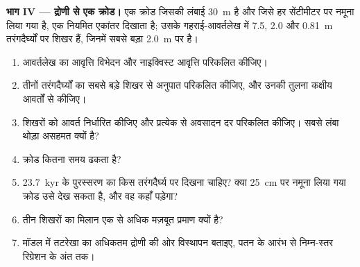 \begin{problem}
\medskip\noindent\textbf{भाग IV --- द्रोणी से एक क्रोड।} एक क्रोड
  जिसकी लंबाई \qty{30}{m} है और जिसे हर सेंटीमीटर पर नमूना लिया गया है, एक नियमित एकांतर दिखाता है;
  उसके गहराई-आवर्तलेख में 7.5, 2.0 और \qty{0.81}{m} तरंगदैर्घ्यों पर शिखर हैं,
  जिनमें सबसे बड़ा \qty{2.0}{m} पर है।
\begin{enumerate}[resume]
\item आवर्तलेख का आवृत्ति विभेदन और
  नाइक्विस्ट आवृत्ति परिकलित कीजिए।
\item तीनों तरंगदैर्घ्यों का सबसे बड़े शिखर से अनुपात परिकलित कीजिए, और
  उनकी तुलना कक्षीय आवर्तों से कीजिए।
\item शिखरों को आवर्त निर्धारित कीजिए और
  प्रत्येक से अवसादन दर परिकलित कीजिए। सबसे लंबा थोड़ा असहमत क्यों है?
\item क्रोड कितना समय ढकता है?
\item \qty{23.7}{kyr} के पुरस्सरण का किस तरंगदैर्घ्य पर दिखना चाहिए?
  क्या \qty{25}{cm} पर नमूना लिया गया क्रोड उसे देख सकता है, और वह कहाँ पड़ेगा?
\item तीन शिखरों का मिलान एक से अधिक मज़बूत प्रमाण क्यों है?
\item मॉडल में तटरेखा का अधिकतम द्रोणी की ओर विस्थापन बताइए,
  पतन के आरंभ से निम्न-स्तर रिग्रेशन के अंत तक।
\end{enumerate}
\end{problem}
